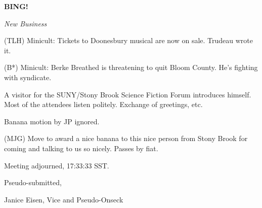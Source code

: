 \documentclass[12pt]{article}
\newcommand{\bing}{{\bf BING!} }
\newcommand{\goto}[1]{\bing \vskip 12pt \centerline{{\em{#1}}}}
\begin{document}
\goto{New Business}

(TLH) Minicult: Tickets to Doonesbury musical are now on sale. Trudeau wrote it.

(B*) Minicult: Berke Breathed is threatening to quit Bloom County. He's fighting with syndicate.

A visitor for the SUNY/Stony Brook Science Fiction Forum introduces himself. Most of the attendees listen politely. Exchange of greetings, etc.

Banana motion by JP ignored.

(MJG) Move to award a nice banana to this nice person from Stony Brook for coming and talking to us so nicely. Passes by fiat.

\vspace{12pt}

\noindent
Meeting adjourned, 17:33:33 SST.

\vspace{18pt}

\centerline{Pseudo-submitted,}
\centerline{Janice Eisen, Vice and Pseudo-Onseck}
\end{document}
